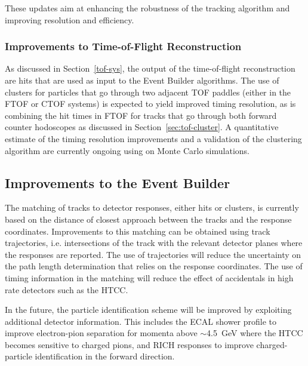 These updates aim at enhancing the robustness of the tracking algorithm and improving resolution and efficiency.

\subsubsection{Improvements to Time-of-Flight Reconstruction}

As discussed in Section~\ref{tof-sys}, the output of the time-of-flight reconstruction are hits that are used
as input to the Event Builder algorithms. The use of clusters for particles that go through two adjacent TOF
paddles (either in the FTOF or CTOF systems) is expected to yield improved timing resolution, as is combining
the hit times in FTOF for tracks that go through both forward counter hodoscopes as discussed in
Section~\ref{sec:tof-cluster}. A quantitative estimate of the timing resolution improvements and a validation of
the clustering algorithm are currently ongoing using on Monte Carlo simulations.

\subsection{Improvements to the Event Builder}

The matching of tracks to detector responses, either hits or clusters, is currently based on the distance of closest
approach between the tracks and the response coordinates. Improvements to this matching can be obtained using
track trajectories, i.e. intersections of the track with the relevant detector planes where the responses are reported.
The use of trajectories will reduce the uncertainty on the path length determination that relies on the response
coordinates. The use of timing information in the matching will reduce the effect of accidentals in high rate detectors
such as the HTCC.

{\color{red}In the future, the particle identification scheme will be improved by exploiting additional detector information. This includes the ECAL shower profile to improve electron-pion separation for momenta above $\sim$4.5~GeV where the HTCC becomes sensitive to
 charged pions, and RICH responses to improve charged-particle identification in the forward direction. }


